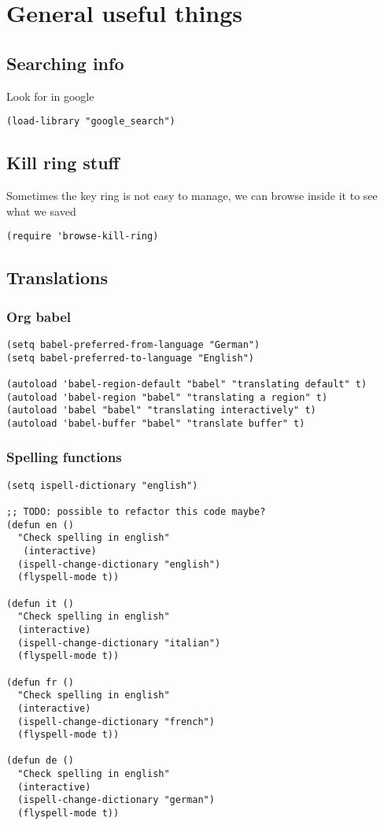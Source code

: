 \documentclass[11pt]{article}
\begin{document}
\section{General useful things}
\label{sec-23}
\subsection{Searching info}
\label{sec-23.1}

   Look for in google
\begin{verbatim}
(load-library "google_search")
\end{verbatim}
\subsection{Kill ring stuff}
\label{sec-23.2}

   Sometimes the key ring is not easy to manage, we can browse inside it to see what we saved
\begin{verbatim}
(require 'browse-kill-ring)
\end{verbatim}
\subsection{Translations}
\label{sec-23.3}
\subsubsection{Org babel}
\label{sec-23.3.1}

\begin{verbatim}
(setq babel-preferred-from-language "German")
(setq babel-preferred-to-language "English")

(autoload 'babel-region-default "babel" "translating default" t)
(autoload 'babel-region "babel" "translating a region" t)
(autoload 'babel "babel" "translating interactively" t)
(autoload 'babel-buffer "babel" "translate buffer" t)
\end{verbatim}
\subsubsection{Spelling functions}
\label{sec-23.3.2}

\begin{verbatim}
(setq ispell-dictionary "english")

;; TODO: possible to refactor this code maybe?
(defun en ()
  "Check spelling in english"
   (interactive)
  (ispell-change-dictionary "english")
  (flyspell-mode t))

(defun it ()
  "Check spelling in english"
  (interactive)
  (ispell-change-dictionary "italian")
  (flyspell-mode t))

(defun fr ()
  "Check spelling in english"
  (interactive)
  (ispell-change-dictionary "french")
  (flyspell-mode t))

(defun de ()
  "Check spelling in english"
  (interactive)
  (ispell-change-dictionary "german")
  (flyspell-mode t))
\end{verbatim}
\end{document}

